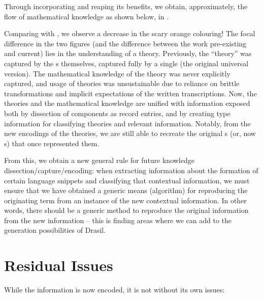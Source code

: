 Through incorporating \ModelKinds{} and reaping its benefits, we obtain,
approximately, the flow of mathematical knowledge as shown below, in
.

\theoriesWithModelKinds{}

Comparing  with , we
observe a decrease in the scary orange colouring! The focal difference in the
two figures (and the difference between the work pre-existing and current) lies
in the understanding of a theory. Previously, the ``theory'' was captured by the
\RelationConcept{}s themselves, captured fully by a single \Expr{} (the original
universal version). The mathematical knowledge of the theory was never
explicitly captured, and usage of theories was unsustainable due to reliance on
brittle transformations  and implicit
expectations of the written transcriptions. Now, the theories and the
mathematical knowledge are unified with information exposed both by dissection
of components as record entries, and by creating type information for
classifying theories and relevant information. Notably, from the new encodings
of the theories, we are still able to recreate the original \Expr{}s (or, now
\ModelExpr{}s) that once represented them.



From this, we obtain a new general rule for future knowledge
dissection/capture/encoding: when extracting information about the formation of
certain language snippets and classifying that contextual information, we must
ensure that we have obtained a generic means (algorithm) for reproducing the
originating term from an instance of the new contextual information. In other words, there should be a generic method to
reproduce the original information from the new information -- this is finding
areas where we can add to the generation possibilities of Drasil.

\section{Residual Issues}

While the information is now encoded, it is not without its own issues:

